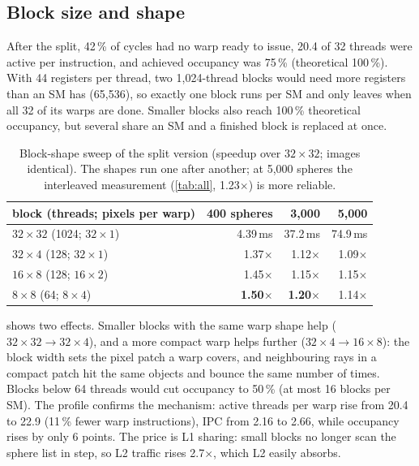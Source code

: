 \documentclass[11pt,a4paper]{article}
\begin{document}
\subsection{Block size and shape}
\label{sec:blocks}

After the split, 42\,\% of cycles had no warp ready to issue, 20.4 of 32 threads were active per
instruction, and achieved occupancy was 75\,\% (theoretical 100\,\%). With 44 registers per thread, two
1,024-thread blocks would need more registers than an SM has (65,536), so exactly one block runs per SM and only leaves when all
32 of its warps are done. Smaller blocks also reach 100\,\% theoretical occupancy, but several share
an SM and a finished block is replaced at once.

\begin{table}[h]
  \centering
  \begin{tabular}{@{}lrrr@{}}
    \toprule
    block (threads; pixels per warp) & 400 spheres & 3,000 & 5,000 \\
    \midrule
    $32 \times 32$ (1024; $32 \times 1$) & 4.39\,ms & 37.2\,ms & 74.9\,ms \\
    $32 \times 4$ (128; $32 \times 1$)   & 1.37$\times$ & 1.12$\times$ & 1.09$\times$ \\
    $16 \times 8$ (128; $16 \times 2$)   & 1.45$\times$ & 1.15$\times$ & 1.15$\times$ \\
    $8 \times 8$ (64; $8 \times 4$)      & \textbf{1.50$\times$} & \textbf{1.20$\times$} & 1.14$\times$ \\
    \bottomrule
  \end{tabular}
  \caption{Block-shape sweep of the split version (speedup over $32 \times 32$; images identical).
    The shapes run one after another; at 5,000 spheres the interleaved measurement
    (\cref{tab:all}, 1.23$\times$) is more reliable.}
  \label{tab:blocks}
\end{table}

 shows two effects. Smaller blocks with the same warp shape help
($32 \times 32 \to 32 \times 4$), and a more compact warp helps further ($32 \times 4 \to 16 \times 8$):
the block width sets the pixel patch a warp covers, and neighbouring rays in a compact patch hit the
same objects and bounce the same number of times. Blocks below 64 threads would cut occupancy to
50\,\% (at most 16 blocks per SM). The profile confirms the mechanism: active threads per warp rise
from 20.4 to 22.9 (11\,\% fewer warp instructions), IPC from 2.16 to 2.66, while occupancy rises by
only 6 points. The price is L1 sharing: small blocks no longer scan the sphere list in step, so L2
traffic rises 2.7$\times$, which L2 easily absorbs.
\end{document}
